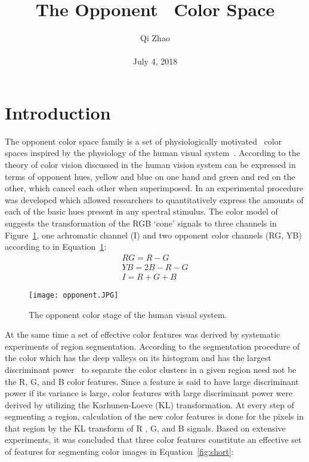 \documentclass[10pt,twocolumn,letterpaper]{article}
\begin{document}
\title{The Opponent~\cite{Waxman1997Color} Color Space}
\author{Qi Zhao\\\\July 4, 2018}

\maketitle
\section{Introduction}
The opponent color space family is a set of physiologically motivated~\cite{Broussard1999Physiologically} color spaces inspired by the physiology of the human visual system~\cite{Thorpe1996Speed}. According to the theory of color vision discussed in the human vision system can be expressed in terms of opponent hues, yellow and blue on one hand and green and red on the other, which cancel each other when superimposed. In  an experimental procedure was developed which allowed researchers to quantitatively express the amounts of each of the basic hues present in any spectral stimulus. The color model of suggests the transformation of the RGB `cone' signals to three channels in Figure~\ref{fig:onecol}, one achromatic channel (I) and two opponent color channels (RG, YB) according to in Equation~\ref{fig:onecol}:
\begin{equation}
\begin{split}
RG = R-G \\
 YB = 2B-R-G \\
 I = R+G+B
 \end{split}
 \label{fig:onecol}
\end{equation}
\begin{figure}[H]
\begin{center}
\texttt{[image: opponent.JPG]}
\end{center}
 \caption{The opponent color stage of the human visual system.}
\label{fig:long}
\label{fig:onecol}
\end{figure}
\par At the same time a set of effective color features was derived by systematic experiments of region segmentation. According to the segmentation procedure of the color which has the deep valleys on its histogram and has the largest discriminant power~\cite{El1997Objective} to separate the color clusters in a given region need not be the R, G, and B color features. Since a feature is said to have large discriminant power if its variance is large, color features with large discriminant power were derived by utilizing the Karhunen-Loeve (KL) transformation. At every step of segmenting a region, calculation of the new color features is done for the pixels in that region by the KL transform of R , G, and B signals. Based on extensive experiments, it was concluded that three color features constitute an effective set of features for segmenting color images in Equation~\ref{fig:short}:
\end{document}
